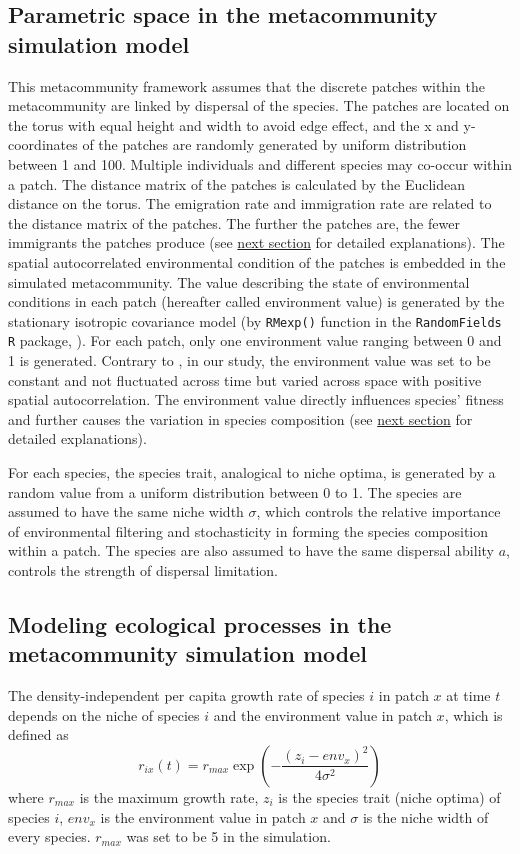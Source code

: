 \subsection{Parametric space in the metacommunity simulation model}
\noindent
This metacommunity framework assumes that the discrete patches within the metacommunity are linked by dispersal of the species. The patches are located on the torus with equal height and width to avoid edge effect, and the x and y-coordinates of the patches are randomly generated by uniform distribution between 1 and 100. Multiple individuals and different species may co-occur within a patch. The distance matrix of the patches is calculated by the Euclidean distance on the torus. The emigration rate and immigration rate are related to the distance matrix of the patches. The further the patches are, the fewer immigrants the patches produce (see \hyperref[Modelc]{next section} for detailed explanations). The spatial autocorrelated environmental condition of the patches is embedded in the simulated metacommunity. The value describing the state of environmental conditions in each patch (hereafter called environment value) is generated by the stationary isotropic covariance model (by \texttt{RMexp()} function in the \texttt{RandomFields} \texttt{R} package, \citealp{schlather2015analysis}). For each patch, only one environment value ranging between 0 and 1 is generated. Contrary to \citet{thompson2020process}, in our study, the environment value was set to be constant and not fluctuated across time but varied across space with positive spatial autocorrelation. The environment value directly influences species' fitness and further causes the variation in species composition  (see \hyperref[Modelc]{next section} for detailed explanations).

For each species, the species trait, analogical to niche optima, is generated by a random value from a uniform distribution between 0 to 1. The species are assumed to have the same niche width $\sigma$, which controls the relative importance of environmental filtering and stochasticity in forming the species composition within a patch. The species are also assumed to have the same dispersal ability $a$, controls the strength of dispersal limitation.

\subsection{Modeling ecological processes in the metacommunity simulation model}
\noindent
\label{Modelc}
The density-independent per capita growth rate of species $i$ in patch $x$ at time $t$ depends on the niche of species $i$ and the environment value in patch $x$, which is defined as 
\[
r_{ix}(t) = r_{max}\exp(-\frac{(z_i-env_x)^2}{4\sigma^2})
\] 
where $r_{max}$ is the maximum growth rate, $z_i$ is the species trait (niche optima) of species $i$, $env_x$ is the environment value in patch $x$ and $\sigma$ is the niche width of every species. $r_{max}$ was set to be 5 in the simulation.

